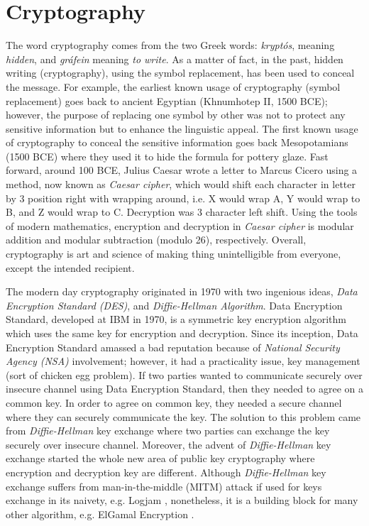 \section{Cryptography}
\label{sec:cryptography}
    The word cryptography comes from the two Greek words: 
    \textit{krypt\'{o}s}, meaning \textit{hidden}, and \textit{gr\'{a}fein} meaning \textit{to write}. As a matter of 
    fact, in the past, hidden writing (cryptography), using the symbol replacement, has been used 
    to conceal the message. For example,
    the earliest known usage of cryptography (symbol replacement) goes back to  ancient 
    Egyptian (Khnumhotep {\rm II}, 1500 BCE); however, the purpose of replacing one symbol by other 
    was not to protect
    any sensitive information but to enhance the linguistic appeal. The first known usage of 
    cryptography to conceal the sensitive information goes back Mesopotamians (1500 BCE) where 
    they used it to hide the formula for pottery glaze. Fast forward, around 100 BCE, 
    Julius Caesar wrote a letter to Marcus  Cicero using a method, now known 
    as \textit{Caesar cipher}, which would shift each character in letter by 3 position right with wrapping 
    around, i.e. X would wrap A, Y would wrap to B, and Z would wrap to C. Decryption was 
	3 character left shift.  Using the  tools of modern mathematics, encryption and decryption 
	in \textit{Caesar cipher} is modular addition and modular subtraction (modulo 26), respectively.  
    Overall, cryptography is art and science of making thing  unintelligible from everyone, except the 
    intended recipient.  	
	    
	The modern day cryptography originated in 1970 with two ingenious ideas, \textit{Data Encryption Standard (DES)}, 
	and \textit{Diffie-Hellman Algorithm}. Data Encryption Standard, developed at IBM in 1970, is a symmetric 
	key encryption algorithm which uses the same key for encryption and decryption. Since its inception, Data Encryption Standard
	amassed a bad reputation because of \textit{National Security Agency (NSA)} involvement; however, it had a 
	practicality issue, key management (sort of chicken egg problem). If two parties wanted to communicate
	securely over insecure channel using Data Encryption Standard, then they needed to agree on a common key. 
	In order to agree on common key, they needed a secure channel where they can securely communicate the key. 
    The solution to this problem came from \textit{Diffie-Hellman} key exchange where two parties can exchange the 
    key securely over insecure channel. Moreover, the advent of \textit{Diffie-Hellman} key exchange started the 
    whole new area of public key cryptography where encryption and decryption key are different. 
    Although \textit{Diffie-Hellman} key exchange suffers from  man-in-the-middle (MITM)  attack if used for keys exchange in its 
    naivety, e.g. Logjam \citep{Adrian:2015:IFS:2810103.2813707}, nonetheless, 
    it is a building block for many other algorithm, e.g. ElGamal Encryption \citep{elgamal1985public}. 
    
